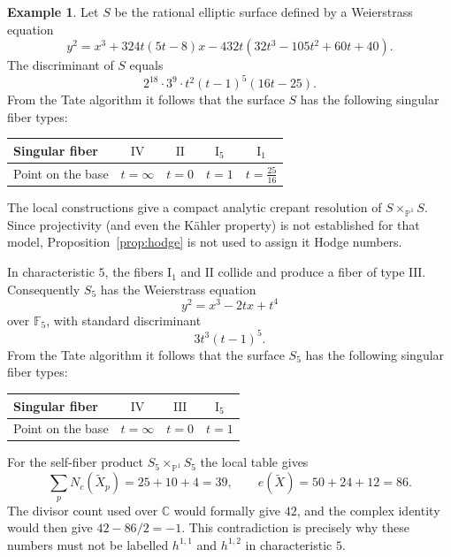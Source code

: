 \documentclass[a4paper]{amsart}
\theoremstyle{plain}
\theoremstyle{definition}
\newtheorem{Exm}[Thm]{Example}
\theoremstyle{remark}
\numberwithin{equation}{section}
\newcommand{\CC}{\mathbb{C}}
\newcommand{\PP}{\mathbb{P}}
\newcommand{\FF}{\mathbb{F}}
\begin{document}
\begin{Exm} \label{ex:61}
 Let $S$ be the rational elliptic surface defined by a Weierstrass equation
\[
y^{2}=x^{3}+324t(5t-8)x-432t(32t^3-105t^2+60t+40).
\]
The discriminant of $S$ equals
\[
2^{18}\cdot 3^9\cdot t^2(t-1)^5(16t-25).
\]
From the Tate algorithm it follows that the surface $S$ has the following singular fiber types:

\begin{table}[H]
	\centering
	\renewcommand{\arraystretch}{1.2}
	\begin{tabular}{lcccc}
		\toprule
		Singular fiber
		& $\mathrm{IV}$
		& $\mathrm{II}$
		& $\mathrm{I}_{5}$ & $\mathrm{I}_{1}$ \\
		\midrule
		Point on the base & $t=\infty$ & $t=0$ & $t=1$ & $t=\frac{25}{16}$ \\
		\bottomrule
	\end{tabular}
\end{table}

The local constructions give a compact analytic crepant resolution of
$S\times_{\PP^{1}}S$.  Since projectivity (and even the K\"ahler property)
is not established for that model, Proposition~\ref{prop:hodge} is not
used to assign it Hodge numbers.

In characteristic $5$, the fibers $\mathrm{I}_1$ and $\mathrm{II}$ collide
and produce a fiber of type $\mathrm{III}$.  Consequently $S_5$ has the
Weierstrass equation
\[
y^2=x^3-2tx+t^4
\]
over $\FF_5$, with standard discriminant
\[
3t^3(t-1)^5.
\]
From the Tate algorithm it follows that the surface $S_5$ has the following singular fiber types:

\begin{table}[H]
	\centering
	\renewcommand{\arraystretch}{1.2}
	\begin{tabular}{lccc}
		\toprule
		Singular fiber
		& $\mathrm{IV}$
		& $\mathrm{III}$
		& $\mathrm{I}_{5}$ \\
		\midrule
		Point on the base & $t=\infty$ & $t=0$ & $t=1$ \\
		\bottomrule
	\end{tabular}
\end{table}

For the self-fiber product $S_{5}\times_{\PP^{1}}S_{5}$ the local table
gives
\[
\sum_pN_c(\widetilde X_p)=25+10+4=39,
\qquad e(\widetilde X)=50+24+12=86.
\]
The divisor count used over $\CC$ would formally give $42$, and the
complex identity would then give $42-86/2=-1$.  This contradiction is
precisely why these numbers must not be labelled $h^{1,1}$ and $h^{1,2}$
in characteristic $5$.
\end{Exm}
\end{document}
